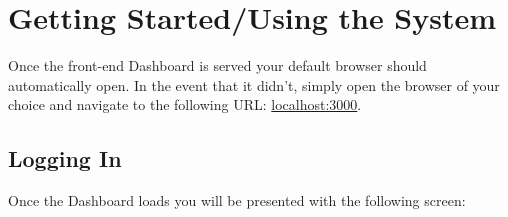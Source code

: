 \documentclass[11pt,a4paper]{article}
\begin{document}

%
%
\pagebreak
\section{Getting Started/Using the System}
Once the front-end Dashboard is served your default browser should automatically open. In the event that it didn't, simply open the browser of your choice and navigate to the following URL: \url{localhost:3000}. 

\subsection{Logging In}
Once the Dashboard loads you will be presented with the following screen:
\end{document}

